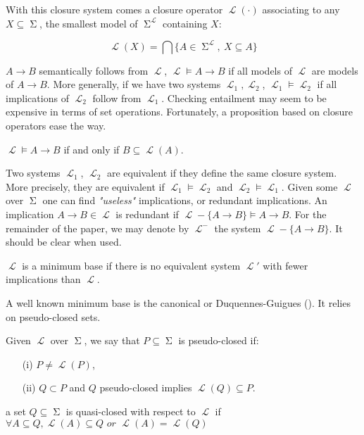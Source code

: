 \documentclass[runningheads]{llncs}
\DeclareMathOperator{\I}{\mathcal{L}}  %
\DeclareMathOperator{\Sg}{\Sigma}  %
\DeclareMathOperator{\imp}{\longrightarrow} %
\begin{document}
With this closure system comes a closure operator $\I(\cdot)$ associating to any $X \subseteq \Sg$, the smallest model of $\Sg^{\I}$ containing $X$:

 \[ \I(X) = \bigcap \{A \in \Sg^{\I},\  X \subseteq A \} \]
 
$A \imp B$ semantically follows from $\I$, $\I \models A \imp B$ if all models of $\I$ are models of $A \imp B$. More generally, if we have two systems $\I_1, \I_2$, $\I_1 \models \I_2$ if all implications of $\I_2$ follow from $\I_1$. Checking entailment may seem to be expensive in terms of set operations. Fortunately, a proposition based on closure operators ease the way.

\begin{proposition} $\I \models A \imp B$ if and only if $B \subseteq \I(A)$.
	\end{proposition}
	
Two systems $\I_1$, $\I_2$ are equivalent if they define the same closure system. More precisely, they are equivalent if $\I_1 \models \I_2$ and $\I_2 \models \I_1$. Given some $\I$ over $\Sg$ one can find \textit{"useless"} implications, or redundant implications. An implication $A \imp B \in \I$ is redundant if $\I - \{ A \imp B \} \models A \imp B$. For the remainder of the paper, we may denote by $\I^{-}$ the system $\I - \{ A \imp B \}$. It should be clear when used. 

\begin{definition} $\I$ is a minimum base if there is no equivalent system $\I'$ with fewer implications than $\I$.
	
\end{definition}

A well known minimum base is the canonical or Duquennes-Guigues (\cite{guigues_familles_1986}). It relies on pseudo-closed sets.

\begin{definition} Given $\I$ over $\Sg$, we say
	that $P \subseteq \Sg$ is pseudo-closed if:
	\begin{itemize}
		\item[(i)] $P \neq \I(P)$,
		\item[(ii)] $Q \subset P$ and $Q$ pseudo-closed implies $\I(Q) 
		\subseteq P$.
	\end{itemize}
\end{definition}

\begin{definition} a set $Q \subseteq \Sg$ is 
quasi-closed with respect to $\I$ if $\forall A \subseteq Q, \I(A) \subseteq Q \textit{ or } \I(A) = \I(Q) $
	
\end{definition}
\end{document}
